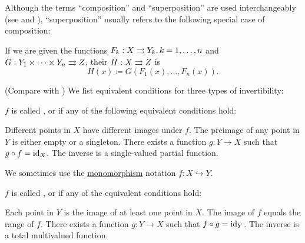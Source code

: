 \begin{definition}
\begin{DefEnum}[resume=def:function]
     Although the terms \enquote{composition} and \enquote{superposition} are used interchangeably (see \cite[44]{Enderton1977} and \cite[]{Фихтенгольц1968/1}), \enquote{superposition} usually refers to the following special case of composition:

    If we are given the functions \( F_k: X \rightrightarrows Y_k, k = 1, \ldots, n \) and \( G: Y_1 \times \cdots \times Y_n \rightrightarrows Z \), their  \( H: X \rightrightarrows Z \) is
    \begin{equation*}
      H(x) \coloneqq G(F_1(x), \ldots, F_n(x)).
    \end{equation*}
  \end{DefEnum}
\end{definition}

\begin{definition}\label{def:function_invertibility}(Compare with )
  We list equivalent conditions for three types of invertibility:
  \begin{DefEnum}
     \( f \) is called ,  or  if any of the following equivalent conditions hold:
    \begin{DefEnum}
       Different points in \( X \) have different images under \( f \).
       The preimage of any point in \( Y \) is either empty or a singleton.
       There exists a function \( g: Y \to X \) such that \( g \circ f = \operatorname{id}_X \).
       The inverse is a single-valued partial function.
    \end{DefEnum}

    We sometimes use the \hyperref[def:morphism_invertibility/monomorphism]{monomorphism} notation \( f: X \hookrightarrow Y \).

     \( f \) is called ,  or  if any of the equivalent conditions hold:
    \begin{DefEnum}
       Each point in \( Y \) is the image of at least one point in \( X \).
       The image of \( f \) equals the range of \( f \).
       There exists a function \( g: Y \to X \) such that \( f \circ g = \operatorname{id}_Y \).
       The inverse is a total multivalued function.
    \end{DefEnum}


\end{DefEnum}
\end{definition}
